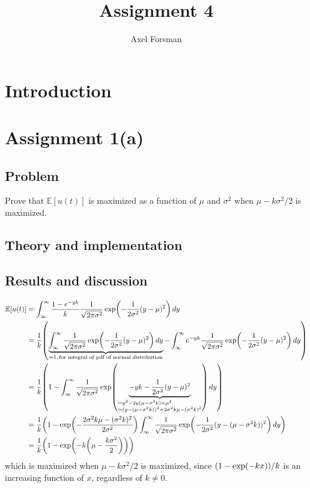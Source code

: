 \documentclass[11pt, a4paper]{article}
\title{Assignment 4}
\author{Axel Forsman}
\let\originalleft\left
\let\originalright\right
\renewcommand{\left}{\mathopen{}\mathclose\bgroup\originalleft}
\renewcommand{\right}{\aftergroup\egroup\originalright}
\begin{document}
\maketitle

\section{Introduction}

\section{Assignment 1(a)}
\subsection{Problem}
Prove that $\mathbb E[u(t)]$ is maximized as a function of
$\mu$ and $\sigma^2$ when $\mu - k\sigma^2/2$ is maximized.
\subsection{Theory and implementation}
\subsection{Results and discussion}
\begin{align*}
	\mathbb E[u(t)] &= \int_\infty^\infty \frac{1 - e^{-yk}}k \frac1{\sqrt{2\pi\sigma^2}}
		\exp\left(-\frac1{2\sigma^2} (y - \mu)^2\right) \, dy \\
		&= \frac1k \left(\underbrace{\int_\infty^\infty \frac1{\sqrt{2\pi\sigma^2}} \exp\left(-\frac1{2\sigma^2} (y - \mu)^2\right) \, dy}_{=1, \, \text{for integral of pdf of normal distribution}}
		- \int_\infty^\infty e^{-yk} \frac1{\sqrt{2\pi\sigma^2}} \exp\left(-\frac1{2\sigma^2} (y - \mu)^2\right) \, dy\right) \\
		&= \frac1k \left(1 - \int_\infty^\infty \frac1{\sqrt{2\pi\sigma^2}}
			\exp\left(\underbrace{-yk - \frac1{2\sigma^2} (y - \mu)^2}_{\begin{subarray}{1}
				= y^2 - 2y(\mu - \sigma^2k) + \mu^2 \\
				= (y - (\mu - \sigma^2k))^2 + 2\sigma^2k\mu - (\sigma^2k)^2
			\end{subarray}}\right) \, dy\right) \\
		&= \frac1k \left(1 - \exp\left(-\frac{2\sigma^2k\mu - (\sigma^2k)^2}{2\sigma^2}\right)
			\int_\infty^\infty \frac1{\sqrt{2\pi\sigma^2}} \exp\left(-\frac1{2\sigma^2} (y - (\mu - \sigma^2k))^2\right) \, dy\right) \\
		&= \frac1k \left(1 - \exp\left(-k \left(\mu - \frac{k\sigma^2}2\right)\right)\right)
\end{align*}
which is maximized when $\mu - k\sigma^2/2$ is maximized, since
$\left(1 - \exp\left(-k x\right)\right) / k$
is an increasing function of $x$, regardless of $k \ne 0$.
\end{document}

